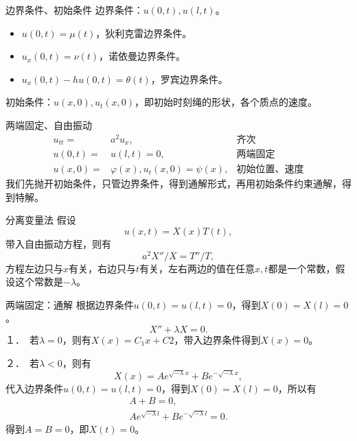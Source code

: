 \documentclass[11pt]{beamer}
\newcommand{\kong}[1][0.5]{\vspace{#1cm}}
\begin{document}
\begin{frame}{边界条件、初始条件}
边界条件：$u(0,t), u(l,t)$。
\begin{itemize}
\item $u(0,t)=\mu(t)$，狄利克雷边界条件。
\item $u_x(0,t) = \nu(t)$，诺依曼边界条件。
\item $u_x(0,t) - hu(0,t) = \theta(t)$，罗宾边界条件。
\end{itemize}

\kong[0.5]
初始条件：$u(x,0),u_t(x,0)$，即初始时刻绳的形状，各个质点的速度。
\end{frame}

\begin{frame}{两端固定、自由振动}
\begin{eqnarray}
u_{tt} =& a^2 u_{x}, &\text{齐次} \\
 u(0,t) =& u(l,t) = 0, &\text{两端固定}\\
 u(x,0) =& \varphi(x), u_t(x,0) = \psi(x), &\text{初始位置、速度}
\end{eqnarray}
我们先抛开初始条件，只管边界条件，得到通解形式，再用初始条件约束通解，得到特解。
\end{frame}

\begin{frame}{分离变量法}
假设
\begin{equation}
u(x,t) = X(x) T(t),
\end{equation}
带入自由振动方程，则有
\begin{equation}
a^2 X''/X = T''/T,
\end{equation}
方程左边只与$x$有关，右边只与$t$有关，左右两边的值在任意$x,t$都是一个常数，假设这个常数是$- \lambda$。
\end{frame}

\begin{frame}{两端固定：通解}
根据边界条件$u(0,t)=u(l,t)=0$，得到$ X(0) = X(l) =0$。
\begin{equation}
X'' + \lambda X = 0.
\end{equation}
１．　若$\lambda=0$，则有$X(x) = C_1 x + C2$，带入边界条件得到$X(x)=0$。

２．　若$\lambda<0$，则有
\begin{equation}
X(x) = A e^{\sqrt{-\lambda}x} + B e^{-\sqrt{-\lambda}x},
\end{equation}
代入边界条件$u(0,t)=u(l,t)=0$，得到$ X(0) = X(l) =0$，所以有
\begin{eqnarray}
A + B = 0, \\
A e^{\sqrt{-\lambda}l}　+ B e^{-\sqrt{-\lambda}l} = 0.
\end{eqnarray} 
得到$ A=B=0$，即$X(t)=0$。
\end{frame}
\end{document}
